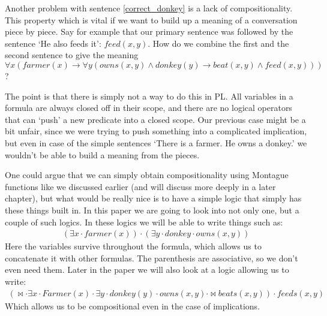\documentclass[12pt]{article}
\begin{document}
Another problem with sentence \eqref{correct_donkey} is a lack of compositionality. This property which is vital if we want to build up a meaning of a conversation piece by piece. Say for example that our primary sentence was followed by the sentence `He also feeds it': $feed(x,y)$. How do we combine the first and the second sentence to give the meaning $\forall x(farmer(x)\rightarrow \forall y(owns(x,y)\wedge donkey(y)\rightarrow beat(x,y)\wedge feed(x,y)))$?

The point is that there is simply not a way to do this in PL. All variables in a formula are always closed off in their scope, and there are no logical operators that can `push' a new predicate into a closed scope. Our previous case might be a bit unfair, since we were trying to push something into a complicated implication, but even in case of the simple sentences `There is a farmer. He owns a donkey.' we wouldn't be able to build a meaning from the pieces.

One could argue that we can simply obtain compositionality using Montague functions like we discussed earlier (and will discuss more deeply in a later chapter), but what would be really nice is to have a simple logic that simply has these things built in. In this paper we are going to look into not only one, but a couple of such logics. In these logics we will be able to write things such as:
%
\begin{align}
(\exists x \cdot farmer(x)) \cdot (\exists y \cdot donkey \cdot owns(x,y))
\end{align}
%
Here the variables survive throughout the formula, which allows us to concatenate it with other formulas. The parenthesis are associative, so we don't even need them.
Later in the paper we will also look at a logic allowing us to write:
%
\begin{align}
(\bowtie \cdot \exists x \cdot Farmer(x) \cdot \exists y \cdot donkey(y) \cdot owns(x,y) \cdot \bowtie beats(x,y)) \cdot feeds(x,y)
\end{align}
%
Which allows us to be compositional even in the case of implications.
\end{document}
